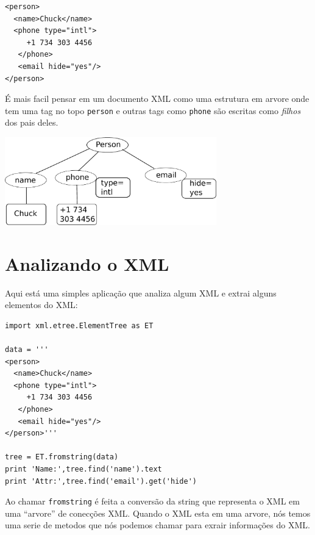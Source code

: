 \beforeverb
\begin{verbatim}
<person>
  <name>Chuck</name>
  <phone type="intl">
     +1 734 303 4456
   </phone>
   <email hide="yes"/>
</person>
\end{verbatim}
\afterverb
%
É mais facil pensar em um documento XML como uma estrutura em arvore
onde tem uma tag no topo {\tt person} e outras tags como {\tt phone}
são escritas como \emph{filhos} dos pais deles. 

\beforefig
\centerline{\includegraphics[height=1.50in]{figs2/xml-tree.eps}}
\afterfig

\section{Analizando o XML}


Aqui está uma simples aplicação que analiza algum XML
e extrai alguns elementos do XML:

\beforeverb
\begin{verbatim}
import xml.etree.ElementTree as ET

data = '''
<person>
  <name>Chuck</name>
  <phone type="intl">
     +1 734 303 4456
   </phone>
   <email hide="yes"/>
</person>'''

tree = ET.fromstring(data)
print 'Name:',tree.find('name').text
print 'Attr:',tree.find('email').get('hide')
\end{verbatim}
\afterverb
%
Ao chamar {\tt fromstring} é feita a conversão da string que 
representa o XML em uma ``arvore'' de conecções XML. Quando o
XML esta em uma arvore, nós temos uma serie de metodos que nós
podemos chamar para exrair informações do XML.

